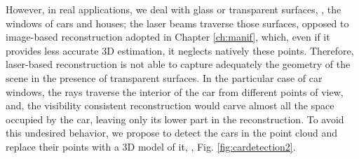 However, in real applications, we deal with glass or transparent surfaces, \eg, the windows of cars and houses; the laser beams traverse those surfaces, opposed to image-based reconstruction adopted in Chapter \ref{ch:manif}, which, even if it provides less accurate 3D estimation, it neglects natively these points.
Therefore, laser-based reconstruction is not able to capture adequately the geometry of the scene in the presence of transparent surfaces. 
In the particular case of car windows, the rays traverse the interior of the car from different points of view, and, the visibility consistent reconstruction would carve almost all the space occupied by the car, leaving only its lower part in the reconstruction.
To avoid this undesired behavior, we propose to detect the cars in the point cloud and replace their points with a 3D model of it, \eg, Fig. \ref{fig:cardetection2}.

